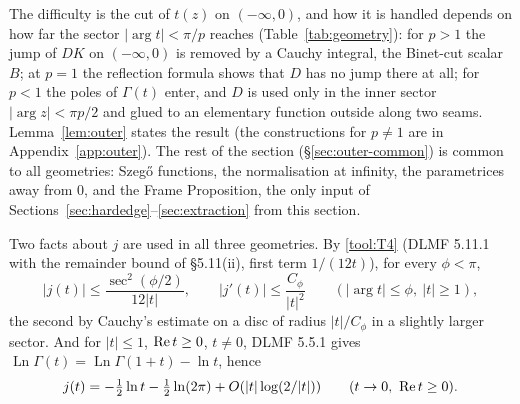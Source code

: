 The difficulty is the cut of $t(z)$ on $(-\infty,0)$, and how it is handled depends on how far the sector
$|\arg t|<\pi/p$ reaches (Table~\ref{tab:geometry}): for $p>1$ the jump of $DK$ on $(-\infty,0)$ is removed by a Cauchy
integral, the Binet-cut scalar $B$; at $p=1$ the reflection formula shows that $D$ has no jump there at all; for $p<1$
the poles of $\Gamma(t)$ enter, and $D$ is used only in the inner sector $|\arg z|<\pi p/2$ and glued to an elementary
function outside along two seams. Lemma~\ref{lem:outer} states the result (the constructions for $p\ne1$ are in
Appendix~\ref{app:outer}). The rest of the section (\S\ref{sec:outer-common}) is common to all geometries: Szeg\H{o}
functions, the normalisation at infinity, the parametrices away from $0$, and the Frame Proposition, the only input of
Sections~\ref{sec:hardedge}--\ref{sec:extraction} from this section.

Two facts about $j$ are used in all three geometries. By \ref{tool:T4} (DLMF 5.11.1 with the remainder bound of
\S5.11(ii), first term $1/(12t)$), for every $\phi<\pi$,
\begin{equation}\label{eq:binet-bound}
  |j(t)|\le\frac{\sec^2(\phi/2)}{12|t|},\qquad |j'(t)|\le\frac{C_\phi}{|t|^2}\qquad(|\arg t|\le\phi,\ |t|\ge1),
\end{equation}
the second by Cauchy's estimate on a disc of radius $|t|/C_\phi$ in a slightly larger sector. And for $|t|\le1$,
$\operatorname{Re} t\ge0$, $t\ne0$, DLMF 5.5.1 gives $\operatorname{Ln}\Gamma(t)=\operatorname{Ln}\Gamma(1+t)-\ln t$, hence
\begin{equation}\label{eq:binet-small}
  j(t)=-\tfrac12\ln t-\tfrac12\ln(2\pi)+O(|t|\log(2/|t|))\qquad(t\to0,\ \re t\ge0).
\end{equation}

